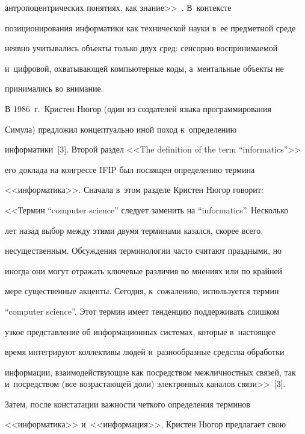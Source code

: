 антропоцентрических понятиях, как знание>>~\cite[c.~17]{2-zac}. В~контексте 

позиционирования информатики как технической науки в~ее предметной среде 

неявно учитывались объекты только двух сред: сенсорно воспринимаемой 

и~циф\-ро\-вой, охва\-ты\-ва\-ющей компьютерные коды, а~ментальные объекты не 

принимались во внимание.

  {

  

  }

  

  В 1986~г.\ Кристен Нюгор (один из создателей языка программирования 

Симула) предложил концептуально иной поход к~определению 

информатики~[3]. Второй раздел <<The definition of the term ``informatics''>> 

его доклада на конгрессе IFIP был посвящен определению термина 

<<информатика>>. Сначала в~этом разделе Кристен Нюгор говорит:

    <<Термин ``computer science'' следует заменить на ``informatics''. Несколько 

лет назад выбор между этими двумя терминами казался, скорее всего, 

несущественным. Об\-суж\-де\-ния терминологии час\-то считают праздными, но 

иногда они могут отражать ключевые различия во мнениях или по крайней 

мере существенные акценты. Сегодня, к~сожалению, используется термин 

``computer science''. Этот термин имеет тенденцию поддерживать слиш\-ком 

узкое пред\-став\-ле\-ние об информационных сис\-те\-мах, которые в~настоящее 

время интегрируют коллективы людей и~разнообразные средства обработки 

информации, взаимодействующие как посредством межличностных связей, так и~посредством (все воз\-рас\-та\-ющей доли) электронных каналов связи>>~[3].

  

  Затем, после констатации важности четкого определения терминов 

<<информатика>> и~<<информация>>, Кристен Нюгор предлагает свою 

